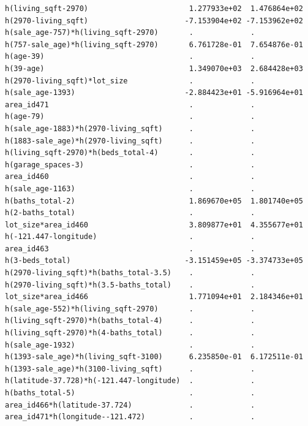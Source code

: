 \documentclass[
]{article}
\begin{document}
\begin{verbatim}
h(living_sqft-2970)                       1.277933e+02  1.476864e+02
h(2970-living_sqft)                      -7.153904e+02 -7.153962e+02
h(sale_age-757)*h(living_sqft-2970)       .             .           
h(757-sale_age)*h(living_sqft-2970)       6.761728e-01  7.654876e-01
h(age-39)                                 .             .           
h(39-age)                                 1.349070e+03  2.684428e+03
h(2970-living_sqft)*lot_size              .             .           
h(sale_age-1393)                         -2.884423e+01 -5.916964e+01
area_id471                                .             .           
h(age-79)                                 .             .           
h(sale_age-1883)*h(2970-living_sqft)      .             .           
h(1883-sale_age)*h(2970-living_sqft)      .             .           
h(living_sqft-2970)*h(beds_total-4)       .             .           
h(garage_spaces-3)                        .             .           
area_id460                                .             .           
h(sale_age-1163)                          .             .           
h(baths_total-2)                          1.869670e+05  1.801740e+05
h(2-baths_total)                          .             .           
lot_size*area_id460                       3.809877e+01  4.355677e+01
h(-121.447-longitude)                     .             .           
area_id463                                .             .           
h(3-beds_total)                          -3.151459e+05 -3.374733e+05
h(2970-living_sqft)*h(baths_total-3.5)    .             .           
h(2970-living_sqft)*h(3.5-baths_total)    .             .           
lot_size*area_id466                       1.771094e+01  2.184346e+01
h(sale_age-552)*h(living_sqft-2970)       .             .           
h(living_sqft-2970)*h(baths_total-4)      .             .           
h(living_sqft-2970)*h(4-baths_total)      .             .           
h(sale_age-1932)                          .             .           
h(1393-sale_age)*h(living_sqft-3100)      6.235850e-01  6.172511e-01
h(1393-sale_age)*h(3100-living_sqft)      .             .           
h(latitude-37.728)*h(-121.447-longitude)  .             .           
h(baths_total-5)                          .             .           
area_id466*h(latitude-37.724)             .             .           
area_id471*h(longitude--121.472)          .             .           
                                                                    

\end{verbatim}
\end{document}
